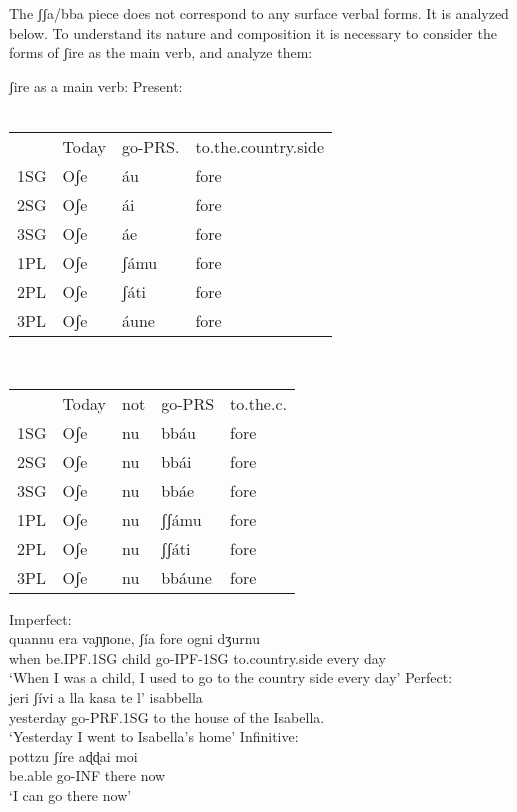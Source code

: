 \documentclass[output=paper]{langscibook}
\begin{document}
The ʃʃa/bba piece does not correspond to any surface verbal forms.  It is analyzed below. To understand its nature and composition it is necessary to consider the forms of ʃire as the main verb, and analyze them:

\ea \label{ac24}ʃire as a main verb:
    \ea \label{ac24a}Present:\\
       \ea\label{ac24ai}~\\
            \begin{table}[htb]
            \begin{tabular}{llll    }
                & Today & go-PRS. & to.the.country.side\\
            1SG & Oʃe   & áu      & fore\\
            2SG & Oʃe   & ái      & fore\\
            3SG & Oʃe   & áe      & fore\\
            1PL & Oʃe   & ʃámu    & fore\\
            2PL & Oʃe   & ʃáti    & fore\\
            3PL & Oʃe   & áune    & fore\\
            \end{tabular}
            \end{table}
        \ex\label{ac24aii}~\\
        \begin{table}[htb]
        \begin{tabular}{lllll}
         & Today & not     & go-PRS              & to.the.c. \\
        1SG & Oʃe   & nu      & bbáu                & fore      \\
        2SG & Oʃe   & nu      & bbái                & fore      \\
        3SG & Oʃe   & nu      & bbáe                & fore      \\
        1PL & Oʃe   & nu      & ʃʃámu               & fore      \\
        2PL & Oʃe   & nu      & ʃʃáti               & fore      \\
        3PL & Oʃe   & nu      & bbáune              & fore     
        \end{tabular}
        \end{table}
        \z  
    \ex \label{ac24b}Imperfect:\\
    \gll      quannu era    vaɲɲone, ʃía      fore    ogni dʒurnu\\
     when be.IPF.1SG child  go-IPF-1SG to.country.side every day\\
     \glt ‘When I was a child, I used to go to the country side every day’
    \ex  \label{ac24c}Perfect: \\
    \gll jeri      ʃívi      a lla  kasa   te l’ isabbella\\
     yesterday  go-PRF.1SG to the house of the Isabella.\\
    \glt ‘Yesterday I went to Isabella’s home’
    \ex \label{ac24d}Infinitive: \\
     \gll pottzu  ʃíre    aɖɖai  moi\\
     be.able go-INF  there now\\
     \glt ‘I can go there now’
    \z
\z
\end{document}
